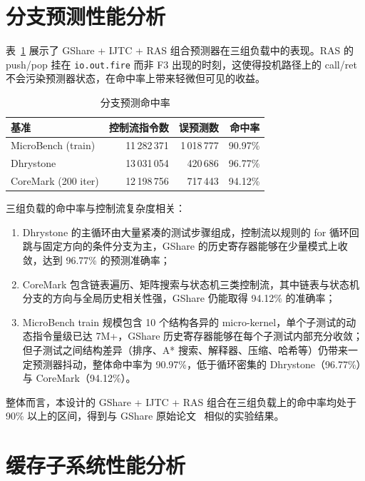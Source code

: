 \section{分支预测性能分析}

表~\ref{tbl:perf-bp} 展示了 GShare + IJTC + RAS 组合预测器在三组负载中的表现。RAS 的 push/pop 挂在 \lstinline|io.out.fire| 而非 F3 出现的时刻，这使得投机路径上的 call/ret 不会污染预测器状态，在命中率上带来轻微但可见的收益。

\begin{table}[H]
  \centering
  \caption{分支预测命中率}
  \label{tbl:perf-bp}
  \begin{tabular}{lrrr}
    \toprule
    基准 & 控制流指令数 & 误预测数 & 命中率 \\
    \midrule
    MicroBench (train) & 11\,282\,371 & 1\,018\,777 & 90.97\% \\
    Dhrystone & 13\,031\,054 & 420\,686 & 96.77\% \\
    CoreMark (200 iter) & 12\,198\,756 & 717\,443 & 94.12\% \\
    \bottomrule
  \end{tabular}
\end{table}

三组负载的命中率与控制流复杂度相关：

\begin{enumerate}
  \item Dhrystone 的主循环由大量紧凑的测试步骤组成，控制流以规则的 for 循环回跳与固定方向的条件分支为主，GShare 的历史寄存器能够在少量模式上收敛，达到 96.77\% 的预测准确率；
  \item CoreMark 包含链表遍历、矩阵搜索与状态机三类控制流，其中链表与状态机分支的方向与全局历史相关性强，GShare 仍能取得 94.12\% 的准确率；
  \item MicroBench train 规模包含 10 个结构各异的 micro-kernel，单个子测试的动态指令量级已达 7M+，GShare 历史寄存器能够在每个子测试内部充分收敛；但子测试之间结构差异（排序、A* 搜索、解释器、压缩、哈希等）仍带来一定预测器抖动，整体命中率为 90.97\%，低于循环密集的 Dhrystone（96.77\%）与 CoreMark（94.12\%）。
\end{enumerate}

整体而言，本设计的 GShare + IJTC + RAS 组合在三组负载上的命中率均处于 90\% 以上的区间，得到与 GShare 原始论文~\cite{mcfarling1993combining} 相似的实验结果。

\section{缓存子系统性能分析}

